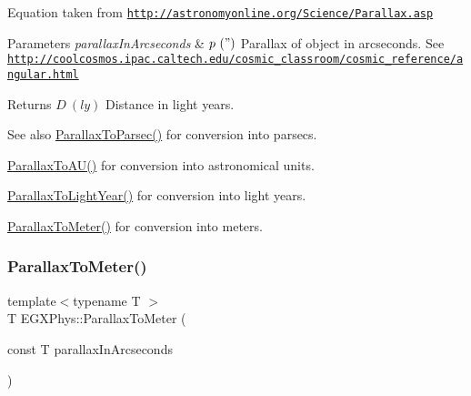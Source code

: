 Equation taken from \href{http://astronomyonline.org/Science/Parallax.asp}{\tt http\+://astronomyonline.\+org/\+Science/\+Parallax.\+asp}


\begin{DoxyParams}{Parameters}
{\em parallax\+In\+Arcseconds} & $ p\ (")$ Parallax of object in arcseconds. See \href{http://coolcosmos.ipac.caltech.edu/cosmic_classroom/cosmic_reference/angular.html}{\tt http\+://coolcosmos.\+ipac.\+caltech.\+edu/cosmic\+\_\+classroom/cosmic\+\_\+reference/angular.\+html} \\
\hline
\end{DoxyParams}
\begin{DoxyReturn}{Returns}
$ D\ (ly)$ Distance in light years. 
\end{DoxyReturn}
\begin{DoxySeeAlso}{See also}
\mbox{\hyperlink{group___e_g_x_phys-_astrophysic-_parallax_gab42dbec142e1a47925fc45e899845861}{Parallax\+To\+Parsec()}} for conversion into parsecs. 

\mbox{\hyperlink{group___e_g_x_phys-_astrophysic-_parallax_ga2085f91170baba79a7fcc8a0ba77d1eb}{Parallax\+To\+A\+U()}} for conversion into astronomical units. 

\mbox{\hyperlink{group___e_g_x_phys-_astrophysic-_parallax_gacaec31498f264e2a1dc285062a394de2}{Parallax\+To\+Light\+Year()}} for conversion into light years. 

\mbox{\hyperlink{group___e_g_x_phys-_astrophysic-_parallax_ga94912bf8b98a04cccab8ef19eaa89b6a}{Parallax\+To\+Meter()}} for conversion into meters. 
\end{DoxySeeAlso}
\mbox{\label{group___e_g_x_phys-_astrophysic-_parallax_ga94912bf8b98a04cccab8ef19eaa89b6a}} 
\subsubsection{\texorpdfstring{Parallax\+To\+Meter()}{ParallaxToMeter()}}
{\footnotesize\ttfamily template$<$typename T $>$ \\
T E\+G\+X\+Phys\+::\+Parallax\+To\+Meter (\begin{DoxyParamCaption}\item[{const T}]{parallax\+In\+Arcseconds }\end{DoxyParamCaption})}



